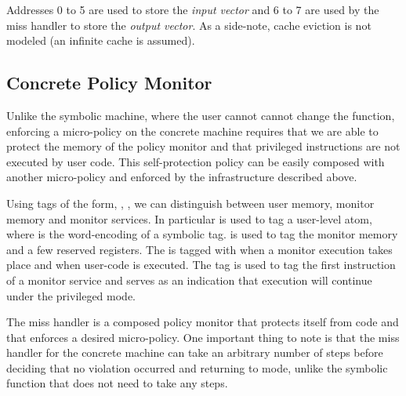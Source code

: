 
Addresses 0 to 5 are used to store the \emph{input vector} and 6 to 7 are used
by the miss handler to store the \emph{output vector}. As a side-note, cache 
eviction is not modeled (an infinite cache is assumed).

\subsection{Concrete Policy Monitor}\label{sec:concrete_policy}

Unlike the symbolic machine, where the user cannot cannot change the 
\TRANSFER function, enforcing a micro-policy on the concrete machine requires
that we are able to protect the memory of the policy monitor and that privileged
instructions are not executed by user code. This self-protection policy can be 
easily composed with another micro-policy and enforced by the infrastructure
described above. 

Using tags of the form, , , \MONITOR we can 
distinguish between user memory, monitor memory and monitor services. 
In particular  is used to tag a user-level atom, where  is
the word-encoding of a symbolic tag. \MONITOR is used to tag the monitor memory
and a few reserved registers. The \pc is tagged with \MONITOR when a monitor
execution takes place and  when user-code is executed. The tag
 is used to tag the first instruction of a monitor service and 
serves as an indication that execution will continue under the privileged
\MONITOR mode. 

The miss handler is a composed policy monitor that protects itself from
\USERname code and that enforces a desired micro-policy.
One important thing to note is that the miss handler for the concrete machine
can take an arbitrary number of steps before deciding that no violation occurred
and returning to \USERname  mode, unlike the symbolic \TRANSFER function that
does not need to take any steps.

